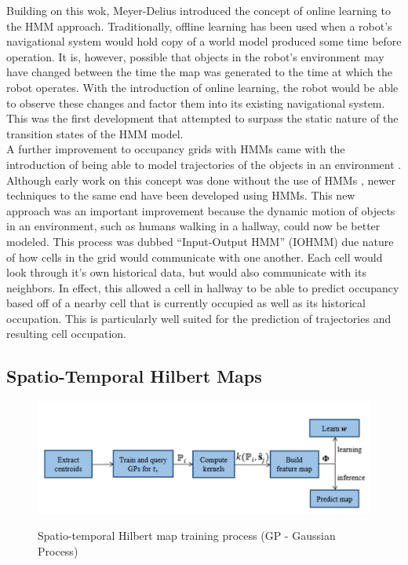   Building on this wok, Meyer-Delius \cite{Meyer-Delius2012} introduced the concept of online
  learning to the HMM approach. Traditionally, offline learning has been used when
  a robot's navigational system would hold copy of a world model produced some
  time before operation. It is, however, possible that objects in the robot's
  environment may have changed between the time the map was generated to the
  time at which the robot operates. With the introduction of online learning, the
  robot would be able to observe these changes and factor them into its existing
  navigational system. This was the first development that attempted to surpass the static
  nature of the transition states of the HMM model. \\

  A further improvement to occupancy grids with HMMs came with the introduction of
  being able to model trajectories of the objects in an environment
  \cite{Wang2015}. Although early work on this concept was done without the use of HMMs
  \cite{Kucner2013}, newer techniques to the same end have been developed using HMMs.
  This new approach was an important improvement because the
  dynamic motion of objects in an environment, such as humans walking in a
  hallway, could now be better modeled. This process was dubbed ``Input-Output
  HMM'' (IOHMM) due nature of how cells in the grid would communicate with one
  another. Each cell would look through it's own historical data, but would
  also communicate with its neighbors. In effect, this allowed
  a cell in hallway to be able to predict occupancy based off of a nearby cell
  that is currently occupied as well as its historical occupation. This is particularly
  well suited for the prediction of trajectories and resulting cell occupation. \\

  \subsection{ Spatio-Temporal Hilbert Maps }

  \begin{figure}[!htb]
    \centering
    \includegraphics[width=\linewidth]{images/STHM_diag.png}
    \caption{Spatio-temporal Hilbert map training process (GP - Gaussian Process)}
    \cite{Senanayake2016}
    \label{figure:STHM}
  \end{figure}

